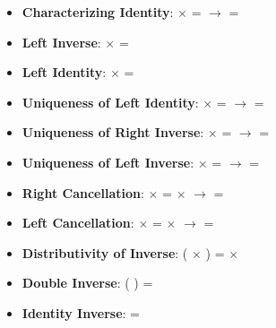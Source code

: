 \documentclass[12pt]{report}
\begin{document}
\begin{enumerate}
  \begin{itemize}
    \item \textbf{Characterizing Identity}:  \ensuremath{\times}  =  \ensuremath{\rightarrow}  = 
    \item \textbf{Left Inverse}:   \ensuremath{\times}  = 
    \item \textbf{Left Identity}:  \ensuremath{\times}  = 
    \item \textbf{Uniqueness of Left Identity}:  \ensuremath{\times}  =  \ensuremath{\rightarrow}  = 
    \item \textbf{Uniqueness of Right Inverse}:  \ensuremath{\times}  =  \ensuremath{\rightarrow}  =  
    \item \textbf{Uniqueness of Left Inverse}:  \ensuremath{\times}  =  \ensuremath{\rightarrow}  =  
    \item \textbf{Right Cancellation}:  \ensuremath{\times}  =  \ensuremath{\times}  \ensuremath{\rightarrow}  = 
    \item \textbf{Left Cancellation}:  \ensuremath{\times}  =  \ensuremath{\times}  \ensuremath{\rightarrow}  = 
    \item \textbf{Distributivity of Inverse}:  ( \ensuremath{\times} ) =   \ensuremath{\times}  
    \item \textbf{Double Inverse}:  ( ) = 
    \item \textbf{Identity Inverse}:   = 
  \end{itemize}



\end{enumerate}
\end{document}
